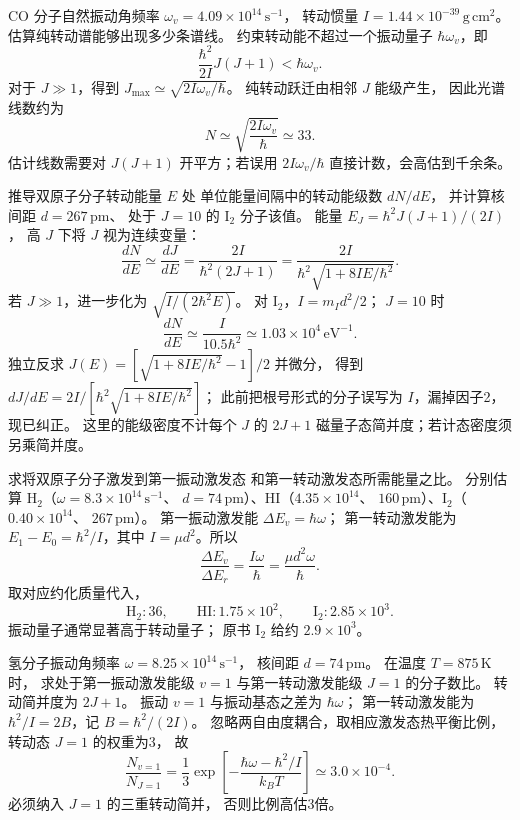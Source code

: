 CO 分子自然振动角频率
$\omega_v=4.09\times10^{14}\,\mathrm{s^{-1}}$，
转动惯量 $I=1.44\times10^{-39}\,\mathrm{g\,cm^2}$。
估算纯转动谱能够出现多少条谱线。
\exsolution
约束转动能不超过一个振动量子
$\hbar\omega_v$，即
\[
 \frac{\hbar^2}{2I}J(J+1)<\hbar\omega_v.
\]
对于 $J\gg1$，得到
$J_{\max}\simeq\sqrt{2I\omega_v/\hbar}$。
纯转动跃迁由相邻 $J$ 能级产生，
因此光谱线数约为
\[
 \boxed{N\simeq\sqrt{\frac{2I\omega_v}{\hbar}}
 \simeq33}.
\]
\excheck 估计线数需要对
$J(J+1)$ 开平方；若误用 $2I\omega_v/\hbar$
直接计数，会高估到千余条。

推导双原子分子转动能量 $E$ 处
单位能量间隔中的转动能级数 $dN/dE$，
并计算核间距 $d=267\,\mathrm{pm}$、
处于 $J=10$ 的 $\mathrm{I_2}$ 分子该值。
\exsolution
能量 $E_J=\hbar^2J(J+1)/(2I)$，
高 $J$ 下将 $J$ 视为连续变量：
\[
 \frac{dN}{dE}\simeq\frac{dJ}{dE}
 =\frac{2I}{\hbar^2(2J+1)}
 =\frac{2I}{\hbar^2\sqrt{1+8IE/\hbar^2}}.
\]
若 $J\gg1$，进一步化为
$\sqrt{I/(2\hbar^2E)}$。
对 $\mathrm{I_2}$，$I=m_Id^2/2$；
$J=10$ 时
\[
 \boxed{\frac{dN}{dE}\simeq
 \frac{I}{10.5\hbar^2}
 \simeq1.03\times10^4\,\mathrm{eV^{-1}}}.
\]
\excheck 独立反求 $J(E)=[\sqrt{1+8IE/\hbar^2}-1]/2$ 并微分，
得到 $dJ/dE=2I/[\hbar^2\sqrt{1+8IE/\hbar^2}]$；
此前把根号形式的分子误写为 $I$，漏掉因子2，现已纠正。
这里的能级密度不计每个 $J$ 的
$2J+1$ 磁量子态简并度；若计态密度须另乘简并度。

求将双原子分子激发到第一振动激发态
和第一转动激发态所需能量之比。
分别估算 $\mathrm{H_2}$（$\omega=8.3\times10^{14}\,\mathrm{s^{-1}}$、
$d=74\,\mathrm{pm}$）、HI（$4.35\times10^{14}$、
$160\,\mathrm{pm}$）、$\mathrm{I_2}$（$0.40\times10^{14}$、
$267\,\mathrm{pm}$）。
\exsolution
第一振动激发能 $\Delta E_v=\hbar\omega$；
第一转动激发能为
$E_1-E_0=\hbar^2/I$，其中
$I=\mu d^2$。所以
\[
 \boxed{\frac{\Delta E_v}{\Delta E_r}
 =\frac{I\omega}{\hbar}
 =\frac{\mu d^2\omega}{\hbar}}.
\]
取对应约化质量代入，
\[
 \boxed{\mathrm{H_2}:36,\qquad
 \mathrm{HI}:1.75\times10^2,\qquad
 \mathrm{I_2}:2.85\times10^3}.
\]
\excheck 振动量子通常显著高于转动量子；
原书 $\mathrm{I_2}$ 给约 $2.9\times10^3$。

氢分子振动角频率
$\omega=8.25\times10^{14}\,\mathrm{s^{-1}}$，
核间距 $d=74\,\mathrm{pm}$。
在温度 $T=875\,\mathrm K$ 时，
求处于第一振动激发能级 $v=1$
与第一转动激发能级 $J=1$ 的分子数比。
转动简并度为 $2J+1$。
\exsolution
振动 $v=1$ 与振动基态之差为
$\hbar\omega$；
第一转动激发能为
$\hbar^2/I=2B$，记 $B=\hbar^2/(2I)$。
忽略两自由度耦合，取相应激发态热平衡比例，
转动态 $J=1$ 的权重为3，
故
\[
 \boxed{\frac{N_{v=1}}{N_{J=1}}
 =\frac13\exp\!\left[
 -\frac{\hbar\omega-\hbar^2/I}{k_BT}\right]
 \simeq3.0\times10^{-4}}.
\]
\excheck 必须纳入 $J=1$ 的三重转动简并，
否则比例高估3倍。


